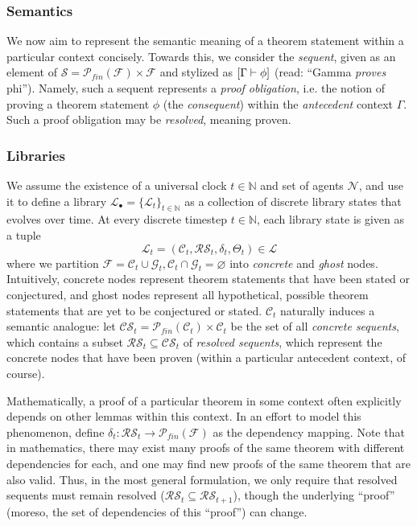 \subsubsection{Semantics}

We now aim to represent the semantic meaning of a theorem statement within a particular context concisely. Towards this, we consider the \textit{sequent}, given as an element of $\mathcal{S} = \mathcal{P}_{fin}(\mathcal{F}) \times \mathcal{F} $ and stylized as $[\Gamma \vdash \phi]$ (read: ``Gamma \textit{proves} phi''). Namely, such a sequent represents a \textit{proof obligation}, i.e. the notion of proving a theorem statement $\phi$ (the \textit{consequent}) within the \textit{antecedent} context $\Gamma$. Such a proof obligation may be \textit{resolved}, meaning proven.

\subsubsection{Libraries}

We assume the existence of a universal clock $t \in \mathbb N$ and set of agents $\mathcal N$, and use it to define a library $\mathcal{L}_\bullet = \{\mathcal{L}_t\}_{t \in \mathbb{N}}$ as a collection of discrete library states that evolves over time. At every discrete timestep $t \in \mathbb{N}$, each library state is given as a tuple 
\[\mathcal{L}_t = (\mathcal{C}_t,\mathcal{RS}_t, \delta_t, \Theta_t) \in \mathscr{L}\]
where we partition $\mathcal{F} = \mathcal{C}_t \cup \mathcal{G}_t, \mathcal{C}_t \cap \mathcal{G}_t = \varnothing$ into \textit{concrete} and \textit{ghost} nodes. Intuitively, concrete nodes represent theorem statements that have been stated or conjectured, and ghost nodes represent all hypothetical, possible theorem statements that are yet to be conjectured or stated. $\mathcal{C}_t$ naturally induces a semantic analogue: let $\mathcal{CS}_t = \mathcal{P}_{fin}(\mathcal{C}_t) \times \mathcal{C}_t$ be the set of all \textit{concrete sequents}, which contains a subset $\mathcal{RS}_t \subseteq \mathcal{CS}_t$ of \textit{resolved sequents}, which represent the concrete nodes that have been proven (within a particular antecedent context, of course). 


Mathematically, a proof of a particular theorem in some context often explicitly depends on other lemmas within this context. In an effort to model this phenomenon, define $\delta_t : \mathcal{RS}_t \to \mathcal{P}_{fin}(\mathcal{F})$ as the dependency mapping.
Note that in mathematics, there may exist many proofs of the same theorem with different dependencies for each, and one may find new proofs of the same theorem that are also valid. Thus, in the most general formulation, we only require that resolved sequents must remain resolved ($\mathcal{RS}_{t} \subseteq \mathcal{RS}_{t+1}$), though the underlying ``proof'' (moreso, the set of dependencies of this ``proof'') can change.

